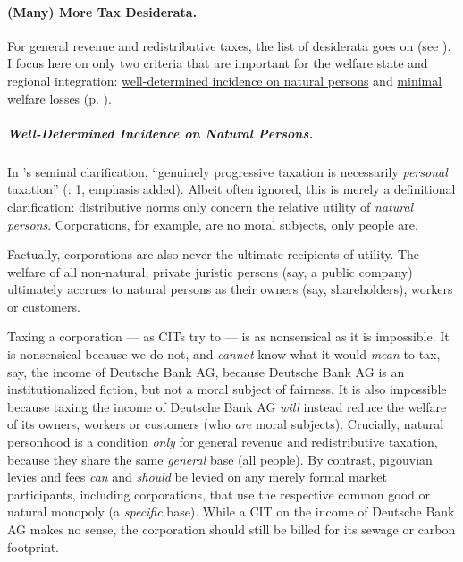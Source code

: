 \paragraph[Tax Desiderata]{(Many) More Tax Desiderata.} For general revenue and redistributive taxes, the list of desiderata goes on (see \citealt{Held2010a}). I focus here on only two criteria that are important for the welfare state and regional integration: \hyperref[sec:well-determined_incidence]{well-determined incidence on natural persons} and \hyperref[sec:minimal_DWL]{minimal welfare losses} (p. \pageref{sec:minimal_DWL}). 

\subparagraph[Incidence]{Well-Determined Incidence on Natural Persons.} \label{sec:well-determined_incidence} In \citeauthor{Vickrey1947}'s seminal clarification, ``genuinely progressive taxation is necessarily \emph{personal} taxation'' (\citeyear{Vickrey1947}: 1, emphasis added). Albeit often ignored, this is merely a definitional clarification: distributive norms only concern the relative utility of \emph{natural persons}. Corporations, for example, are no moral subjects, only people are. 

Factually, corporations are also never the ultimate recipients of utility. The welfare of all non-natural, private juristic persons (say, a public company) ultimately accrues to natural persons as their owners (say, shareholders), workers or customers. 

Taxing a corporation --- as \glspl{CIT} try to --- is as nonsensical as it is impossible. It is nonsensical because we do not, and \emph{cannot} know what it would \emph{mean} to tax, say, the income of Deutsche Bank AG, because Deutsche Bank AG is an institutionalized fiction, but not a moral subject of fairness. It is also impossible because taxing the income of Deutsche Bank AG \emph{will} instead reduce the welfare of its owners, workers or customers (who \emph{are} moral subjects).
Crucially, natural personhood is a condition \emph{only} for general revenue and redistributive taxation, because they share the same \emph{general} base (all people). By contrast, pigouvian levies and fees \emph{can} and \emph{should} be levied on any merely formal market participants, including corporations, that use the respective common good or natural monopoly (a \emph{specific} base). While a \gls{CIT} on the income of Deutsche Bank AG makes no sense, the corporation should still be billed for its sewage or carbon footprint.

